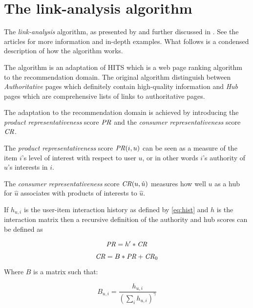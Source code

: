 \section{The link-analysis algorithm}\label{sec:linkanalysis}


The \textit{link-analysis} algorithm, as presented by \cite{huang2004link} and further discussed in \cite{huang2007comparison}. See the articles for more information and in-depth examples. What follows is a condensed description of how the algorithm works.

The algorithm is an adaptation of HITS \cite{kleinberg1999authoritative} which is a web page ranking algorithm to the recommendation domain. The original algorithm distinguish between \textit{Authoritative} pages which definitely contain high-quality information and \textit{Hub} pages which are comprehensive lists of links to authoritative pages. \citep{huang2007comparison}

The adaptation to the recommendation domain is achieved by introducing the \textit{product representativeness} score $\mathit{PR}$ and the \textit{consumer representativeness} score $\mathit{CR}$.

The \textit{product representativeness} score $\mathit{PR}(i, u)$ can be seen as a measure of the item $i$'s level of interest with respect to user $u$, or in other words $i$'s authority of $u$'s interests in $i$.

The \textit{consumer representativeness} score $\mathit{CR}(u, \hat{u})$ measures how well $u$ as a hub for $\hat{u}$ associates with products of interests to $\hat{u}$.

If $h_{u, i}$ is the user-item interaction history as defined by \ref{eq:hist} and $h$ is the interaction matrix then a recursive definition of the authority and hub scores can be defined as

\begin{equation}
    \mathit{PR} = h' * \mathit{CR}
\end{equation}

\begin{equation}
    \mathit{CR} = B * \mathit{PR} + \mathit{CR}_0
\end{equation}

Where $B$ is a matrix such that:

\begin{equation}
    B_{u, i} = \frac{ h_{u, i} }{ \left(\sum_{i} h_{u, i}\right)^\gamma }
\end{equation}

